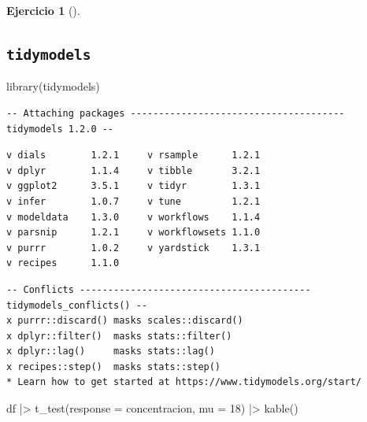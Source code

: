 \documentclass[
  a4paper,
]{scrreport}
\newenvironment{Shaded}{\begin{snugshade}}{\end{snugshade}}
\newcommand{\AttributeTok}[1]{\textcolor[rgb]{0.40,0.45,0.13}{#1}}
\newcommand{\DecValTok}[1]{\textcolor[rgb]{0.68,0.00,0.00}{#1}}
\newcommand{\FunctionTok}[1]{\textcolor[rgb]{0.28,0.35,0.67}{#1}}
\newcommand{\NormalTok}[1]{\textcolor[rgb]{0.00,0.23,0.31}{#1}}
\newcommand{\SpecialCharTok}[1]{\textcolor[rgb]{0.37,0.37,0.37}{#1}}
\theoremstyle{definition}
\newtheorem{exercise}{Ejercicio}[chapter]
\theoremstyle{remark}
\begin{document}
\begin{exercise}[]
\begin{enumerate}
\begin{tcolorbox}
  \section{\texorpdfstring{\texttt{tidymodels}}{tidymodels}}

\begin{Shaded}
\begin{Highlighting}[]
\FunctionTok{library}\NormalTok{(tidymodels)}
\end{Highlighting}
\end{Shaded}

\begin{verbatim}
-- Attaching packages -------------------------------------- tidymodels 1.2.0 --
\end{verbatim}

\begin{verbatim}
v dials        1.2.1     v rsample      1.2.1
v dplyr        1.1.4     v tibble       3.2.1
v ggplot2      3.5.1     v tidyr        1.3.1
v infer        1.0.7     v tune         1.2.1
v modeldata    1.3.0     v workflows    1.1.4
v parsnip      1.2.1     v workflowsets 1.1.0
v purrr        1.0.2     v yardstick    1.3.1
v recipes      1.1.0     
\end{verbatim}

\begin{verbatim}
-- Conflicts ----------------------------------------- tidymodels_conflicts() --
x purrr::discard() masks scales::discard()
x dplyr::filter()  masks stats::filter()
x dplyr::lag()     masks stats::lag()
x recipes::step()  masks stats::step()
* Learn how to get started at https://www.tidymodels.org/start/
\end{verbatim}

\begin{Shaded}
\begin{Highlighting}[]
\NormalTok{df }\SpecialCharTok{|\textgreater{}} 
    \FunctionTok{t\_test}\NormalTok{(}\AttributeTok{response =}\NormalTok{ concentracion, }\AttributeTok{mu =} \DecValTok{18}\NormalTok{) }\SpecialCharTok{|\textgreater{}} 
    \FunctionTok{kable}\NormalTok{() }
\end{Highlighting}
\end{Shaded}


\end{tcolorbox}
\end{enumerate}
\end{exercise}
\end{document}
